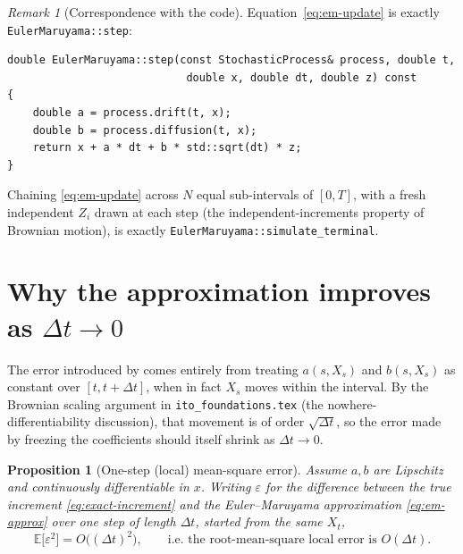 \documentclass[11pt]{article}
\newcommand{\E}{\mathbb{E}}
\newcommand{\drift}{a}
\newcommand{\diff}{b}
\theoremstyle{plain}
\newtheorem{proposition}{Proposition}
\theoremstyle{definition}
\theoremstyle{remark}
\newtheorem{remark}{Remark}
\begin{document}
\begin{remark}[Correspondence with the code]\label{rem:em-code}
Equation~\eqref{eq:em-update} is exactly \texttt{EulerMaruyama::step}:
\begin{verbatim}
double EulerMaruyama::step(const StochasticProcess& process, double t,
                            double x, double dt, double z) const
{
    double a = process.drift(t, x);
    double b = process.diffusion(t, x);
    return x + a * dt + b * std::sqrt(dt) * z;
}
\end{verbatim}
Chaining \eqref{eq:em-update} across $N$ equal sub-intervals of
$[0,T]$, with a fresh independent $Z_i$ drawn at each step (the
independent-increments property of Brownian motion), is exactly
\texttt{EulerMaruyama::simulate\_terminal}.
\end{remark}

\section{Why the approximation improves as $\Delta t\to 0$}\label{sec:local-error}

The error introduced by  comes entirely from treating
$\drift(s,X_s)$ and $\diff(s,X_s)$ as constant over $[t,t+\Delta t]$,
when in fact $X_s$ moves within the interval. By the Brownian scaling
argument in \texttt{ito\_foundations.tex} (the nowhere-differentiability
discussion), that movement is of order $\sqrt{\Delta t}$, so the
error made by freezing the coefficients should itself shrink as
$\Delta t \to 0$.

\begin{proposition}[One-step (local) mean-square error]\label{prop:local-error}
Assume $\drift,\diff$ are Lipschitz and continuously differentiable in
$x$. Writing $\varepsilon$ for the difference between the true
increment \eqref{eq:exact-increment} and the Euler--Maruyama
approximation \eqref{eq:em-approx} over one step of length
$\Delta t$, started from the same $X_t$,
\[
   \E\big[\varepsilon^2\big] = O\big((\Delta t)^2\big),
   \qquad\text{i.e. the root-mean-square local error is } O(\Delta t).
\]
\end{proposition}
\end{document}
